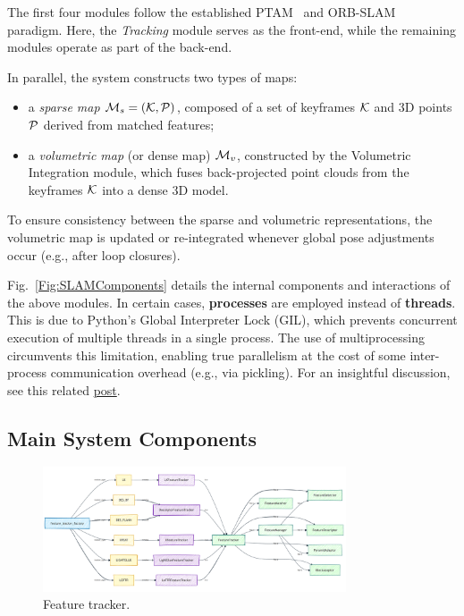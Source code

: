 \documentclass{article}
\begin{document}
The first four modules follow the established PTAM~\cite{PTAM} and ORB-SLAM~\cite{ORB_SLAM2} paradigm. Here, the \textit{Tracking} module serves as the front-end, while the remaining modules operate as part of the back-end.

In parallel, the system constructs two types of maps:
\begin{itemize}
\item a \emph{sparse map} ${\cal M}_s = ({\cal K}, {\cal P})$, composed of a set of keyframes $\cal K$ and 3D points ${\cal P}$ derived from matched features;
\item a \emph{volumetric map} (or dense map) ${\cal M}_v$, constructed by the Volumetric Integration module, which fuses back-projected point clouds from the keyframes $\cal K$ into a dense 3D model.
\end{itemize}

To ensure consistency between the sparse and volumetric representations, the volumetric map is updated or re-integrated whenever global pose adjustments occur (e.g., after loop closures).

Fig.~\ref{Fig:SLAMComponents} details the internal components and interactions of the above modules. In certain cases, \textbf{processes} are employed instead of \textbf{threads}. This is due to Python's Global Interpreter Lock (GIL), which prevents concurrent execution of multiple threads in a single process. The use of multiprocessing circumvents this limitation, enabling true parallelism at the cost of some inter-process communication overhead (e.g., via pickling). For an insightful discussion, see this related \href{https://www.theserverside.com/blog/Coffee-Talk-Java-News-Stories-and-Opinions/Is-Pythons-GIL-the-software-worlds-biggest-blunder}{post}.



\subsection{Main System Components}

\begin{figure}[!h]
\begin{center}
    \includegraphics[width=0.8\textwidth]{./images/feature_tracker.png}
\end{center}
\caption{Feature tracker.}
\label{Fig:FeatureTracker}
\end{figure}
\end{document}
